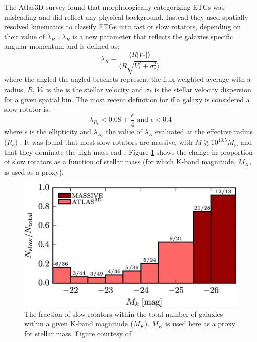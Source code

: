 	The Atlas3D survey \citep{Cappellari2011} found that morphologically categorizing ETGs was misleading and did reflect any physical background. Instead they used spatially resolved kinematics to classify ETGs into fast or slow rotators, depending on their value of $\lambda_R$ \citep{Emsellem2011}. $\lambda_R$ is a new parameter that reflects the galaxies specific angular momentum and is defined as:
	\begin{equation}
		\lambda_R \equiv \frac{\langle R |V_\ast|\rangle}{\langle R \sqrt{V_\ast^2 + \sigma_\ast^2}\rangle}
	\end{equation}
	where the angled the angled brackets represent the flux weighted average with a radius, $R$, $V_\ast$ is the is the stellar velocity and $\sigma_\ast$ is the stellar velocity dispersion for a given spatial bin. The most recent definition for if a galaxy is considered a slow rotator is:
	\begin{equation}
		\lambda_{R_e} < 0.08 + \frac{\epsilon}{4} \text{  and  } \epsilon < 0.4
	\end{equation}
	where $\epsilon$ is the ellipticity and $\lambda_{R_e}$ the value of $\lambda_R$ evaluated at the effective radius ($R_e$) \citep{}. %
	It was found that most slow rotators are massive, with $M \gtrsim 10^{10.5} M_\odot$ and that they dominate the high mass end \citep{Emsellem2011, Veale2016}. Figure \ref{fig:introSlowRotFrac} shows the change in proportion of slow rotators as a function of stellar mass (for which K-band magnitude, $M_K$, is used as a proxy).


	\begin{figure}
		\centering
		\includegraphics[width=\textwidth]{introduction/slowRotFraction.jpeg}
		\caption[Proportion of Slow Rotating Galaxies as a function of Mass]{The fraction of slow rotators within the total number of galaxies within a given K-band magnitude ($M_K$). $M_K$ is used here as a proxy for stellar mass. Figure courtesy of \citet{Veale2016}}
		\label{fig:introSlowRotFrac}
	\end{figure}



